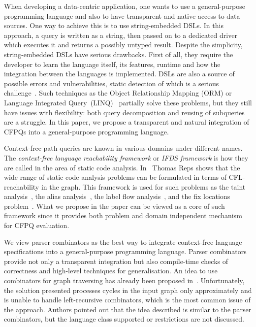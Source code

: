 When developing a data-centric application, one wants to use a general-purpose programming language and also to have transparent and native access to data sources.
One way to achieve this is to use string-embedded DSLs.
In this approach, a query is written as a string, then passed on to a dedicated driver which executes it and returns a possibly untyped result.
Despite the simplicity, string-embedded DSLs have serious drawbacks.
First of all, they require the developer to learn the language itself, its features, runtime and how the integration between the languages is implemented.
DSLs are also a source of possible errors and vulnerabilities, static detection of which is a serious challenge~\cite{stringEmbeddedLanguagesProblem}.
Such techniques as the Object Relationship Mapping (ORM) or Language Integrated Query~(LINQ)~\cite{LINQ1, LINQ2, LinqRDF} partially solve these problems, but they still have issues with flexibility: both query decomposition and  reusing of subqueries are a struggle.
In this paper, we propose a transparent and natural integration of CFPQs into a general-purpose programming language.

Context-free path queries are known in various domains under different names. The \emph{context-free language reachability framework} or  \emph{IFDS framework} is how they are called in the area of static code analysis.
In~\cite{Reps:1995, Reps} Thomas Reps shows that the wide range of static code analysis problems can be formulated in terms of CFL-reachability in the graph.
This framework is used for such problems as the taint analysis~\cite{CFLTaint}, the alias analysis~\cite{JavaCFL, Zheng, CFLGraspan}, the label flow analysis~\cite{LabelFlowCFLReachability}, and the fix locations problem~\cite{CFLfinding}.
What we propose in the paper can be viewed as a core of such framework since it provides both problem and domain independent mechanism for CFPQ evaluation.

We view parser combinators as the best way to integrate context-free language specifications into a general-purpose programming language. Parser combinators provide not only a transparent integration but also compile-time checks of correctness and high-level techniques for generalisation. An idea to use combinators for graph traversing has already been proposed in~\cite{ScalaGraphParsing}. Unfortunately, the solution presented processes cycles in the input graph only approximately and is unable to handle left-recursive combinators, which is the most common issue of the approach. Authors pointed out that the idea described is similar to the parser combinators, but the language class supported or restrictions are not discussed.


